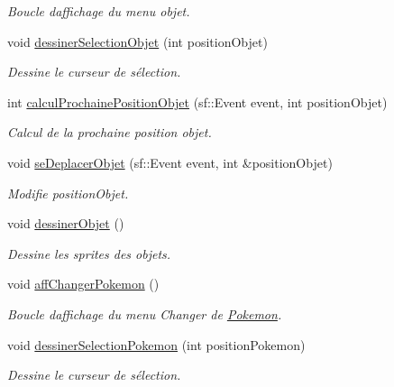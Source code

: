 \begin{DoxyCompactItemize}
\begin{DoxyCompactList}\small\item\em Boucle d\textquotesingle{}affichage du menu objet. \end{DoxyCompactList}\item 
void \hyperlink{class_s_f_m_l_combat_a578125c9faee0eebfaa898b5d6ae6f6e}{dessiner\+Selection\+Objet} (int position\+Objet)
\begin{DoxyCompactList}\small\item\em Dessine le curseur de sélection. \end{DoxyCompactList}\item 
int \hyperlink{class_s_f_m_l_combat_a06e5c66f031d48316b7d779a9589c18e}{calcul\+Prochaine\+Position\+Objet} (sf\+::\+Event event, int position\+Objet)
\begin{DoxyCompactList}\small\item\em Calcul de la prochaine position objet. \end{DoxyCompactList}\item 
void \hyperlink{class_s_f_m_l_combat_ac41423229acd874f68463a462fdfce08}{se\+Deplacer\+Objet} (sf\+::\+Event event, int \&position\+Objet)
\begin{DoxyCompactList}\small\item\em Modifie position\+Objet. \end{DoxyCompactList}\item 
void \hyperlink{class_s_f_m_l_combat_a82520574af06d7d4bcb145f0a37fe691}{dessiner\+Objet} ()
\begin{DoxyCompactList}\small\item\em Dessine les sprites des objets. \end{DoxyCompactList}\item 
void \hyperlink{class_s_f_m_l_combat_ab8d4dfb3e7e4ca9722e52c1ef5fa897d}{aff\+Changer\+Pokemon} ()
\begin{DoxyCompactList}\small\item\em Boucle d\textquotesingle{}affichage du menu Changer de \hyperlink{class_pokemon}{Pokemon}. \end{DoxyCompactList}\item 
void \hyperlink{class_s_f_m_l_combat_ab37fca053d9f0e3529502c69f0de1055}{dessiner\+Selection\+Pokemon} (int position\+Pokemon)
\begin{DoxyCompactList}\small\item\em Dessine le curseur de sélection. \end{DoxyCompactList}\item 

\end{DoxyCompactItemize}
